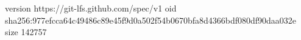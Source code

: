 version https://git-lfs.github.com/spec/v1
oid sha256:977efcca64c49486c89e45f9d0a502f54b0670bfa8d4366bdf080df90daa032e
size 142757
